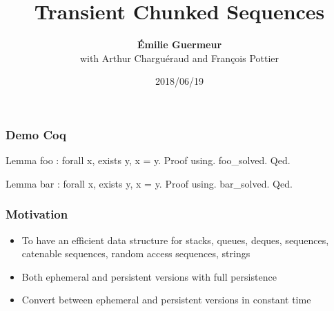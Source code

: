 \def\macrosUseBeamer{}




\usepackage{multicol}

\newcommand\tab{$\hphantom{--}$}





\title{Transient Chunked Sequences}
\author[Émilie Guermeur]{{\bf Émilie Guermeur}\\ \vspace{1em} with Arthur Charguéraud and François Pottier }
\date{2018/06/19}

\frame{\titlepage}




\begin{frame}[fragile]
\frametitle{Demo Coq}

\begin{coq}
  Lemma foo : forall x, exists y, x = y.
  Proof using.
    foo_solved.
  Qed.
\end{coq}

\begin{coqs}
  Lemma bar : forall x, exists y, x = y.
  Proof using.
    bar_solved.
  Qed.
\end{coqs}

\end{frame}



\begin{frame}[fragile]
\frametitle{Motivation}

\begin{itemize}
	\setlength\itemsep{1.5em}
	\item To have an efficient data structure for stacks, queues, deques, sequences, catenable sequences, random access sequences, strings\\
	\item Both ephemeral and persistent versions with full persistence\\
	\item Convert between ephemeral and persistent versions in constant time
\end{itemize}

\end{frame}

